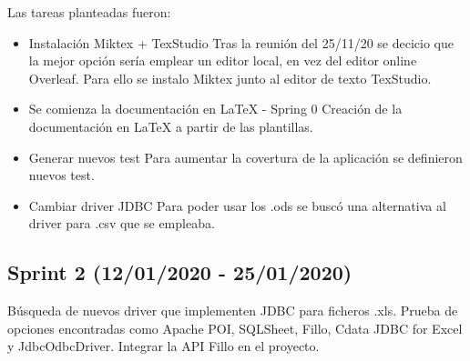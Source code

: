 Las tareas planteadas fueron:
\begin{itemize}
	\tightlist
	\item Instalación Miktex + TexStudio
		Tras la reunión del 25/11/20 se decicio que la mejor opción sería emplear un editor local, en vez del editor online Overleaf. Para ello se instalo Miktex junto al editor de texto TexStudio.
	\item Se comienza la documentación en LaTeX  - Spring 0
		Creación de la documentación en LaTeX a partir de las plantillas.
	\item Generar nuevos test
		Para aumentar la covertura de la aplicación se definieron nuevos test.
	\item Cambiar driver JDBC 
		Para poder usar los .ods se buscó una alternativa al driver para .csv que se empleaba.
\end{itemize}

\subsection{Sprint 2 (12/01/2020 - 25/01/2020)}
Búsqueda de nuevos driver que implementen JDBC para ficheros .xls. Prueba de opciones encontradas como Apache POI, SQLSheet, Fillo, Cdata JDBC for Excel y JdbcOdbcDriver. Integrar la API Fillo en el proyecto. 

